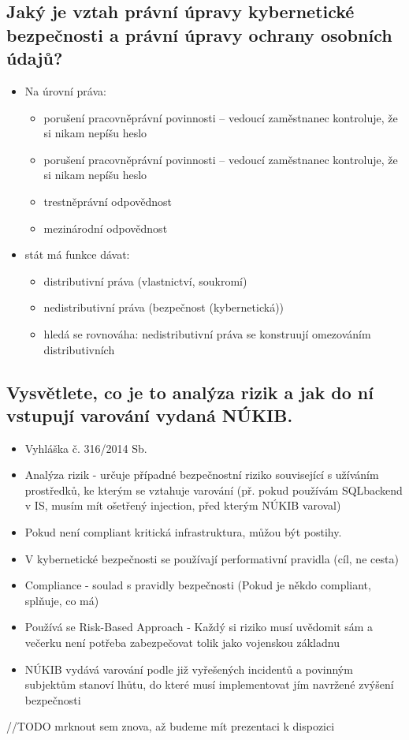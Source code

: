 \subsection{ Jaký je vztah právní úpravy kybernetické bezpečnosti a právní úpravy ochrany osobních údajů?}
\begin{itemize}
    \item Na úrovní práva:
    \begin{itemize}
        \item porušení pracovněprávní povinnosti – vedoucí zaměstnanec kontroluje, že si nikam nepíšu heslo
        \item  porušení pracovněprávní povinnosti – vedoucí zaměstnanec kontroluje, že si nikam nepíšu heslo
        \item trestněprávní odpovědnost
        \item mezinárodní odpovědnost
    \end{itemize}
    \item stát má funkce dávat:
    \begin{itemize}
        \item distributivní práva (vlastnictví, soukromí)
        \item nedistributivní práva (bezpečnost (kybernetická))
        \item hledá se rovnováha: nedistributivní práva se konstruují omezováním distributivních
    \end{itemize}
\end{itemize}

\subsection{Vysvětlete, co je to analýza rizik a jak do ní vstupují varování vydaná NÚKIB.}
\begin{itemize}
    \item Vyhláška č. 316/2014 Sb.
    \item Analýza rizik - určuje případné bezpečnostní riziko související s užíváním prostředků, ke kterým se vztahuje varování (př. pokud používám SQLbackend v IS, musím mít ošetřený injection, před kterým NÚKIB varoval)
    \item {} Pokud není compliant kritická infrastruktura, můžou být postihy.
    \item V kybernetické bezpečnosti se používají performativní pravidla (cíl, ne cesta)
    \item Compliance - soulad s pravidly bezpečnosti (Pokud je někdo compliant, splňuje, co má)
    \item Používá se Risk-Based Approach - Každý si riziko musí uvědomit sám a večerku není potřeba zabezpečovat tolik jako vojenskou základnu
    \item NÚKIB vydává varování podle již vyřešených incidentů a povinným subjektům stanoví lhůtu, do které musí implementovat jím navržené zvýšení bezpečnosti
\end{itemize}
//TODO mrknout sem znova, až budeme mít prezentaci k dispozici
